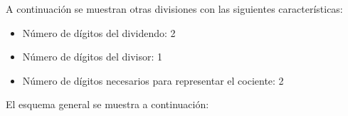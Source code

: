 \documentclass[svgnames,addpoints]{exam}
\newlength{\zerowidth}
\newlength{\zeroheight}
\begin{document}
\begin{questions}
\begin{minipage}{0.25\linewidth}
\begin{center}
    \end{center}
  \end{minipage}
  
  
  \question
  A continuación se muestran otras divisiones con las siguientes características:

  \begin{itemize}
    
  \item Número de dígitos del dividendo: 2
    
  \item Número de dígitos del divisor: 1
    
  \item Número de dígitos necesarios para representar el cociente: 2
    
  \end{itemize}  
  
  El esquema general se muestra a continuación:

  \noindent\begin{minipage}{0.25\linewidth}
    \begin{center}
      \begin{tikzpicture}


        
        

\end{tikzpicture}
\end{center}
\end{minipage}
\end{questions}
\end{document}
